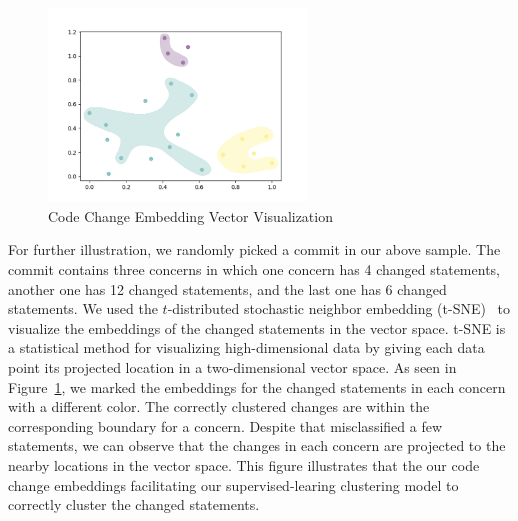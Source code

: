 
\begin{figure}[t]
	\centering
	\includegraphics[width=2.7in]{figures/RQ5.png}
	\vspace{-18pt}
	\caption{Code Change Embedding Vector Visualization}
	\label{fig:vis}
\end{figure}

For further illustration, we randomly picked a commit in our above
sample. The commit contains three concerns in which one concern has 4
changed statements, another one has 12 changed statements, and the
last one has 6 changed statements. We used the $t$-distributed
stochastic neighbor embedding (t-SNE)~\cite{tsne} to visualize the
embeddings of the changed statements in the vector space. t-SNE is a
statistical method for visualizing high-dimensional data by giving
each data point its projected location in a two-dimensional vector
space. As seen in Figure~\ref{fig:vis}, we marked the embeddings for
the changed statements in each concern with a different color. The
correctly clustered changes are within the corresponding boundary for
a concern. Despite that {\tool} misclassified a few statements,
we can observe that the changes in each concern are projected to the
nearby locations in the vector space. This figure illustrates that the
our code change embeddings facilitating our supervised-learing
clustering model to correctly cluster the changed statements.




